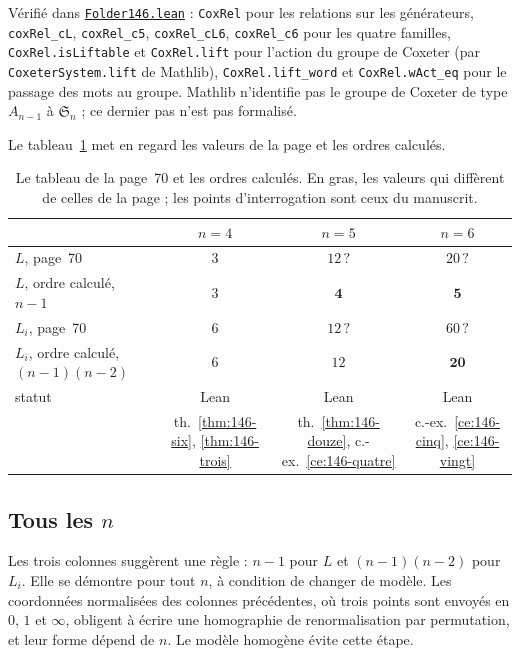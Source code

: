 \begin{sloppypar}
\noindent Vérifié dans \href{\leanblob/AlgebraicGeometry/Folder146.lean}{\texttt{Folder146.\allowbreak{}lean}} : \texttt{CoxRel} pour les relations sur les générateurs, \texttt{coxRel\_cL}, \texttt{coxRel\_c5}, \texttt{coxRel\_cL6}, \texttt{coxRel\_c6} pour les quatre familles, \texttt{CoxRel.isLiftable} et \texttt{CoxRel.lift} pour l'action du groupe de Coxeter (par \texttt{CoxeterSystem.lift} de Mathlib), \texttt{CoxRel.lift\_word} et \texttt{CoxRel.wAct\_eq} pour le passage des mots au groupe. Mathlib n'identifie pas le groupe de Coxeter de type $A_{n-1}$ à $\mathfrak S_n$ ; ce dernier pas n'est pas formalisé.
\end{sloppypar}

Le tableau~\ref{tab:146-exposants} met en regard les valeurs de la page et les ordres calculés.

\begin{table}[htbp]
\centering\small
\begin{tabular}{@{}lccc@{}}
\toprule
& $n = 4$ & $n = 5$ & $n = 6$ \\
\midrule
$L$, page~70 & $3$ & $12\,?$ & $20\,?$ \\
$L$, ordre calculé, $n - 1$ & $3$ & $\mathbf 4$ & $\mathbf 5$ \\
\addlinespace
$L_i$, page~70 & $6$ & $12\,?$ & $60\,?$ \\
$L_i$, ordre calculé, $(n - 1)(n - 2)$ & $6$ & $12$ & $\mathbf{20}$ \\
\midrule
statut & Lean & Lean & Lean \\
& th.~\ref{thm:146-six}, \ref{thm:146-trois} & th.~\ref{thm:146-douze}, c.-ex.~\ref{ce:146-quatre} & c.-ex.~\ref{ce:146-cinq}, \ref{ce:146-vingt} \\
\bottomrule
\end{tabular}
\caption{Le tableau de la page~70 et les ordres calculés. En gras, les valeurs qui diffèrent de celles de la page ; les points d'interrogation sont ceux du manuscrit.}
\label{tab:146-exposants}
\end{table}

\subsection*{Tous les $n$}

Les trois colonnes suggèrent une règle : $n - 1$ pour $L$ et $(n - 1)(n - 2)$ pour $L_i$. Elle se démontre pour tout $n$, à condition de changer de modèle. Les coordonnées normalisées des colonnes précédentes, où trois points sont envoyés en $0$, $1$ et $\infty$, obligent à écrire une homographie de renormalisation par permutation, et leur forme dépend de $n$. Le modèle homogène évite cette étape.

